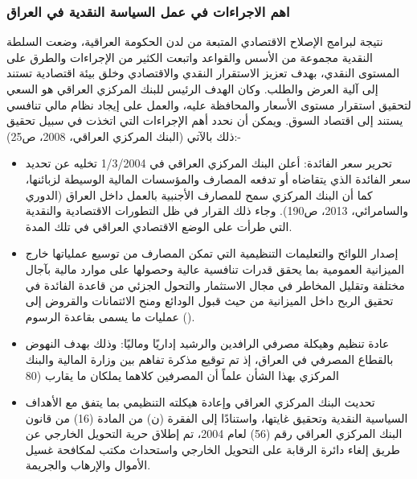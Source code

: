 \documentclass[10pt,a4paper]{report}
\begin{document}
\begin{doublespacing}
\subsubsection{اهم الاجراءات في عمل السياسة النقدية في العراق}
نتيجة لبرامج الإصلاح الاقتصادي المتبعة من لدن الحكومة العراقية، وضعت السلطة النقدية مجموعة من الأسس والقواعد واتبعت الكثير من الإجراءات والطرق على المستوى النقدي، بهدف تعزيز الاستقرار النقدي والاقتصادي وخلق بيئة اقتصادية تستند إلى آلية العرض والطلب. وكان الهدف الرئيس للبنك المركزي العراقي هو السعي لتحقيق استقرار مستوى الأسعار والمحافظة عليه، والعمل على إيجاد نظام مالي تنافسي يستند إلى اقتصاد السوق. ويمكن أن نحدد أهم الإجراءات التي اتخذت في سبيل تحقيق ذلك بالآتي ({البنك المركزي العراقي، 2008، ص25}):-
\begin{itemize}
	\item تحرير سعر الفائدة: أعلن البنك المركزي العراقي في 1/3/2004 تخليه عن تحديد سعر الفائدة الذي يتقاضاه أو تدفعه المصارف والمؤسسات المالية الوسيطة لزبائنها، كما أن البنك المركزي سمح للمصارف الأجنبية بالعمل داخل العراق ({الدوري والسامرائي، 2013، ص190}). وجاء ذلك القرار في ظل التطورات الاقتصادية والنقدية التي طرأت على الوضع الاقتصادي العراقي في تلك المدة.
	\item إصدار اللوائح والتعليمات التنظيمية التي تمكن المصارف من توسيع عملياتها خارج الميزانية العمومية بما يحقق قدرات تنافسية عالية وحصولها على موارد مالية بآجال مختلفة وتقليل المخاطر في مجال الاستثمار والتحول الجزئي من قاعدة الفائدة في تحقيق الربح داخل الميزانية من حيث قبول الودائع ومنح الائتمانات والقروض إلى عمليات ما يسمى بقاعدة الرسوم ().
	\item عادة تنظيم وهيكلة مصرفي الرافدين والرشيد إداريًا وماليًا: وذلك بهدف النهوض بالقطاع المصرفي في العراق، إذ تم توقيع مذكرة تفاهم بين وزارة المالية والبنك المركزي بهذا الشأن علماً أن المصرفين كلاهما يملكان ما يقارب (80%
	\item تحديث البنك المركزي العراقي وإعادة هيكلته التنظيمي بما يتفق مع الأهداف السياسية النقدية وتحقيق غايتها، واستنادًا إلى الفقرة (ن) من المادة (16) من قانون البنك المركزي العراقي رقم (56) لعام 2004، تم إطلاق حرية التحويل الخارجي عن طريق إلغاء دائرة الرقابة على التحويل الخارجي واستحداث مكتب لمكافحة غسيل الأموال والإرهاب والجريمة.

\end{itemize}
\end{doublespacing}
\end{document}
